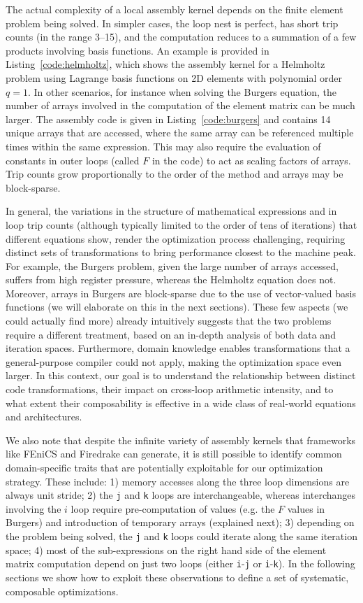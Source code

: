 The actual complexity of a local assembly kernel depends on the finite element problem being solved. In simpler cases, the loop nest is perfect, has short trip counts (in the range 3--15), and the computation reduces to a summation of a few products involving basis functions. An example is provided in Listing~\ref{code:helmholtz}, which shows the assembly kernel for a Helmholtz problem using Lagrange basis functions on 2D elements with polynomial order $q=1$. In other scenarios, for instance when solving the Burgers equation, the number of arrays involved in the computation of the element matrix can be much larger. The assembly code is given in Listing~\ref{code:burgers} and contains 14 unique arrays that are accessed, where the same array can be referenced multiple times within the same expression. This may also require the evaluation of constants in outer loops (called $F$ in the code) to act as scaling factors of arrays. Trip counts grow proportionally to the order of the method and arrays may be block-sparse.

In general, the variations in the structure of mathematical expressions and in loop trip counts (although typically limited to the order of tens of iterations) that different equations show, render the optimization process challenging, requiring distinct sets of transformations to bring performance closest to the machine peak. For example, the Burgers problem, given the large number of arrays accessed, suffers from high register pressure, whereas the Helmholtz equation does not. Moreover, arrays in Burgers are block-sparse due to the use of vector-valued basis functions (we will elaborate on this in the next sections). These few aspects (we could actually find more) already intuitively suggests that the two problems require a different treatment, based on an in-depth analysis of both data and iteration spaces. Furthermore, domain knowledge enables transformations that a general-purpose compiler could not apply, making the optimization space even larger. In this context, our goal is to understand the relationship between distinct code transformations, their impact on cross-loop arithmetic intensity, and to what extent their composability is effective in a wide class of real-world equations and architectures.

We also note that despite the infinite variety of assembly kernels that frameworks like FEniCS and Firedrake can generate, it is still possible to identify common domain-specific traits that are potentially exploitable for our optimization strategy. These include: 1) memory accesses along the three loop dimensions are always unit stride; 2) the \texttt{j} and \texttt{k} loops are interchangeable, whereas interchanges involving the $i$ loop require pre-computation of values (e.g. the $F$ values in Burgers) and introduction of temporary arrays (explained next); 3) depending on the problem being solved, the \texttt{j} and \texttt{k} loops could iterate along the same iteration space; 4) most of the sub-expressions on the right hand side of the element matrix computation depend on just two loops (either \texttt{i}-\texttt{j} or \texttt{i}-\texttt{k}). In the following sections we show how to exploit these observations to define a set of systematic, composable optimizations.

